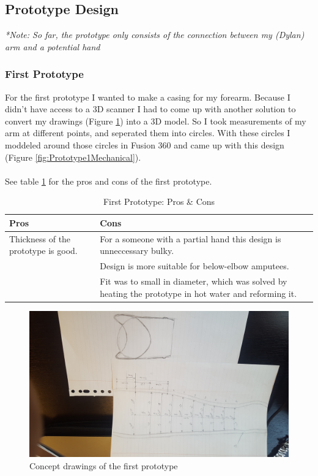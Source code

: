 \documentclass[11pt, a4paper]{article}
\begin{document}
\subsection{Prototype Design}
\textit{*Note: So far, the prototype only consists of the connection between my (Dylan) arm and a potential hand}

\subsubsection{First Prototype}
For the first prototype I wanted to make a casing for my forearm.
Because I didn't have access to a 3D scanner I had to come up with another solution to convert my drawings (Figure \ref{fig:ConceptPrototype1}) into a 3D model.
So I took measurements of my arm at different points, and seperated them into circles.
With these circles I moddeled around those circles in Fusion 360 and came up with this design (Figure \ref{fig:Prototype1Mechanical}). 
\\ \\
See table \ref{tab:FirstPrototypeProsCons} for the pros and cons of the first prototype.
\begin{table}[ht]
    \centering
    \begin{tabular}[t]{p{6cm} p{6cm}}
    \toprule
    \textbf{Pros} & \textbf{Cons} \\
    \midrule
    Thickness of the prototype is good. & For a someone with a partial hand this design is unneccessary bulky. \\
    & Design is more suitable for below-elbow amputees. \\
    & Fit was to small in diameter, which was solved by heating the prototype in hot water and reforming it. \\
    \bottomrule
    \end{tabular}
    \caption{First Prototype: Pros \& Cons}
    \label{tab:FirstPrototypeProsCons}
\end{table}

\begin{figure}[h]
    \centering
    \includegraphics[scale=0.08, angle=180]{ConceptPrototype1.jpg}
    \caption{Concept drawings of the first prototype}
    \label{fig:ConceptPrototype1}
\end{figure} 
\end{document}
